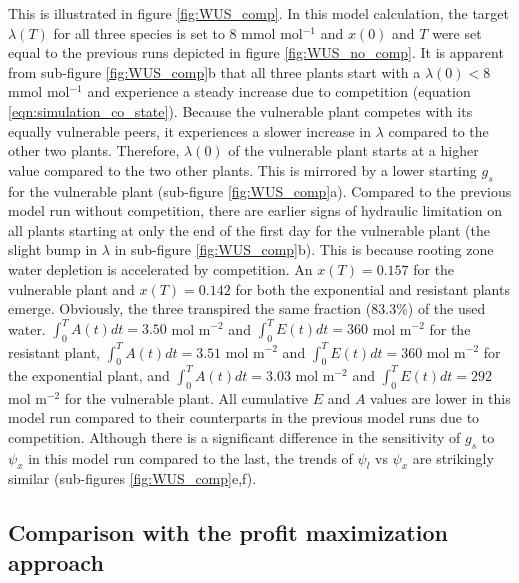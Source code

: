 \documentclass[utf8]{frontiersSCNS} %
\begin{document}
This is illustrated in figure \ref{fig:WUS_comp}. In this model calculation, the target $\lambda(T)$ for all three species is set to 8 mmol mol$^{-1}$ and $x(0)$ and $T$ were set equal to the previous runs depicted in figure \ref{fig:WUS_no_comp}. It is apparent from sub-figure \ref{fig:WUS_comp}b that all three plants start with a $\lambda(0) < 8$ mmol mol$^{-1}$ and experience a steady increase due to competition (equation \ref{eqn:simulation_co_state}). Because the vulnerable plant competes with its equally vulnerable peers, it experiences a slower increase in $\lambda$ compared to the other two plants. Therefore, $\lambda(0)$ of the vulnerable plant starts at a higher value compared to the two other plants. This is mirrored by a lower starting $g_s$ for the vulnerable plant (sub-figure \ref{fig:WUS_comp}a). Compared to the previous model run without competition, there are earlier signs of hydraulic limitation on all plants starting at only the end of the first day for the vulnerable plant (the slight bump in $\lambda$ in sub-figure \ref{fig:WUS_comp}b). This is because rooting zone water depletion is accelerated by competition. An $x(T)=0.157$ for the vulnerable plant and $x(T)=0.142$ for both the exponential and resistant plants emerge. Obviously, the three transpired the same fraction (83.3\%) of the used water. $\int_0^TA(t)dt= 3.50$ mol m$^{-2}$ and $\int_0^TE(t)dt= 360$ mol m$^{-2}$ for the resistant plant, $\int_0^TA(t)dt= 3.51$ mol m$^{-2}$ and $\int_0^TE(t)dt= 360$ mol m$^{-2}$ for the exponential plant, and $\int_0^TA(t)dt= 3.03$ mol m$^{-2}$ and $\int_0^TE(t)dt= 292$ mol m$^{-2}$ for the vulnerable plant. All cumulative $E$ and $A$ values are lower in this model run compared to their counterparts in the previous model runs due to competition. Although there is a significant difference in the sensitivity of $g_s$ to $\psi_x$ in this model run compared to the last, the trends of $\psi_l$ vs $\psi_x$ are strikingly similar (sub-figures \ref{fig:WUS_comp}e,f). 

\subsection{Comparison with the profit maximization approach}
\end{document}
